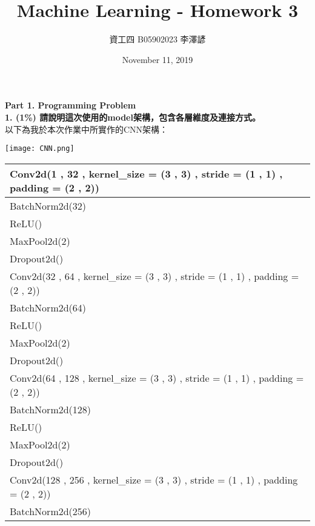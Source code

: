 \documentclass{article}
\title{Machine Learning - Homework 3}
\author{資工四 B05902023 李澤諺}
\date{November 11, 2019}
\begin{document}
\maketitle

\noindent
{\bf \LARGE Part 1. Programming Problem}\\

\noindent
{\bf 1. (1\%) 請說明這次使用的model架構，包含各層維度及連接方式。}\\

以下為我於本次作業中所實作的CNN架構：

\begin{center}
    \texttt{[image: CNN.png]}
\end{center}

\begin{center}
    \begin{tabular}{|l|}
        \hline
        Conv2d(1 , 32 , kernel\_size = (3 , 3) , stride = (1 , 1) , padding = (2 , 2))\\
        \hline
        BatchNorm2d(32)\\
        \hline
        ReLU()\\
        \hline
        MaxPool2d(2)\\
        \hline
        Dropout2d()\\
        \hline
        Conv2d(32 , 64 , kernel\_size = (3 , 3) , stride = (1 , 1) , padding = (2 , 2))\\
        \hline
        BatchNorm2d(64)\\
        \hline
        ReLU()\\
        \hline
        MaxPool2d(2)\\
        \hline
        Dropout2d()\\
        \hline
        Conv2d(64 , 128 , kernel\_size = (3 , 3) , stride = (1 , 1) , padding = (2 , 2))\\
        \hline
        BatchNorm2d(128)\\
        \hline
        ReLU()\\
        \hline
        MaxPool2d(2)\\
        \hline
        Dropout2d()\\
        \hline
        Conv2d(128 , 256 , kernel\_size = (3 , 3) , stride = (1 , 1) , padding = (2 , 2))\\
        \hline
        BatchNorm2d(256)\\
        \hline
    \end{tabular}
\end{center}
\end{document}
